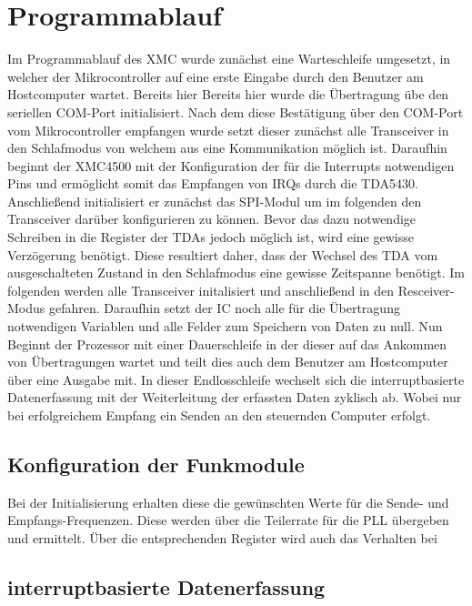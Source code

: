\section{Programmablauf}
Im Programmablauf des XMC wurde zunächst eine Warteschleife umgesetzt, in welcher der Mikrocontroller auf eine erste Eingabe durch den Benutzer am Hostcomputer wartet. Bereits hier Bereits hier wurde die Übertragung übe den seriellen COM-Port initialisiert. Nach dem diese Bestätigung über den COM-Port vom Mikrocontroller empfangen wurde setzt dieser zunächst alle Transceiver in den Schlafmodus von welchem aus eine Kommunikation möglich ist. Daraufhin beginnt der XMC4500 mit der Konfiguration der für die Interrupts notwendigen Pins und ermöglicht somit das Empfangen von \acp{IRQ} durch die TDA5430. Anschließend initialisiert er zunächst das SPI-Modul um im folgenden den Transceiver darüber konfigurieren zu können. Bevor das dazu notwendige Schreiben in die Register der TDAs jedoch möglich ist, wird eine gewisse Verzögerung benötigt. Diese resultiert daher, dass der Wechsel des TDA vom ausgeschalteten Zustand in den Schlafmodus eine gewisse Zeitspanne benötigt. 
Im folgenden werden alle Transceiver initalisiert und anschließend in den Resceiver-Modus gefahren.  
Daraufhin setzt der \ac{IC} noch alle für die Übertragung notwendigen Variablen  und alle Felder zum Speichern von Daten zu null. 
Nun Beginnt der Prozessor mit einer Dauerschleife in der dieser auf das Ankommen von Übertragungen wartet und teilt dies auch dem Benutzer am Hostcomputer über eine Ausgabe mit. In dieser Endlosschleife wechselt sich die interruptbasierte Datenerfassung mit der Weiterleitung der erfassten Daten zyklisch ab. Wobei nur bei erfolgreichem Empfang ein Senden an den steuernden Computer erfolgt. 


\subsection{Konfiguration der Funkmodule}

 Bei der Initialisierung erhalten diese die gewünschten Werte für die Sende- und Empfangs-Frequenzen. Diese werden über die Teilerrate für die  \ac{PLL} übergeben und ermittelt. Über die entsprechenden Register wird auch das Verhalten bei
\subsection{interruptbasierte Datenerfassung}


